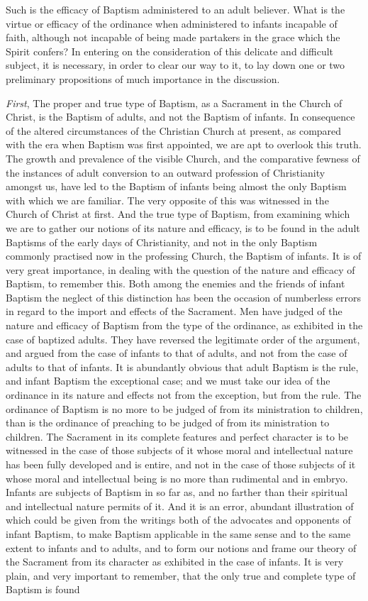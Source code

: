 \documentclass[english,]{book}
\begin{document}
Such is the efficacy of Baptism administered to an adult believer. What is the virtue or efficacy of the ordinance when administered to infants incapable of faith, although not incapable of being made partakers in the grace which the Spirit confers? In entering on the consideration of this delicate and difficult subject, it is necessary, in order to clear our way to it, to lay down one or two preliminary propositions of much importance in the discussion.

\emph{First}, The proper and true type of Baptism, as a Sacrament in the Church of Christ, is the Baptism of adults, and not the Baptism of infants. In consequence of the altered circumstances of the Christian Church at present, as compared with the era when Baptism was first appointed, we are apt to overlook this truth. The growth and prevalence of the visible Church, and the comparative fewness of the instances of adult conversion to an outward profession of Christianity amongst us, have led to the Baptism of infants being almost the only Baptism with which we are familiar. The very opposite of this was witnessed in the Church of Christ at first. And the true type of Baptism, from examining which we are to gather our notions of its nature and efficacy, is to be found in the adult Baptisms of the early days of Christianity, and not in the only Baptism commonly practised now in the professing Church, the Baptism of infants. It is of very great importance, in dealing with the question of the nature and efficacy of Baptism, to remember this. Both among the enemies and the friends of infant Baptism the neglect of this distinction has been the occasion of numberless errors in regard to the import and effects of the Sacrament. Men have judged of the nature and efficacy of Baptism from the type of the ordinance, as exhibited in the case of baptized adults. They have reversed the legitimate order of the argument, and argued from the case of infants to that of adults, and not from the case of adults to that of infants. It is abundantly obvious that adult Baptism is the rule, and infant Baptism the exceptional case; and we must take our idea of the ordinance in its nature and effects not from the exception, but from the rule. The ordinance of Baptism is no more to be judged of from its ministration to children, than is the ordinance of preaching to be judged of from its ministration to children. The Sacrament in its complete features and perfect character is to be witnessed in the case of those subjects of it whose moral and intellectual nature has been fully developed and is entire, and not in the case of those subjects of it whose moral and intellectual being is no more than rudimental and in embryo. Infants are subjects of Baptism in so far as, and no farther than their spiritual and intellectual nature permits of it. And it is an error, abundant illustration of which could be given from the writings both of the advocates and opponents of infant Baptism, to make Baptism applicable in the same sense and to the same extent to infants and to adults, and to form our notions and frame our theory of the Sacrament from its character as exhibited in the case of infants. It is very plain, and very important to remember, that the only true and complete type of Baptism is found 
\end{document}
